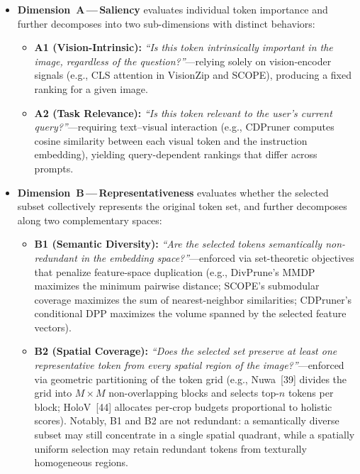 \documentclass[10pt,letterpaper]{article}
\newcommand{\eg}{e.g.}
\begin{document}
\begin{itemize}[leftmargin=*]
  \item \textbf{Dimension~A\,---\,Saliency} evaluates individual token
        importance and further decomposes into two sub-dimensions with
        distinct behaviors:
  \begin{itemize}
    \item \textbf{A1 (Vision-Intrinsic):}
          \textit{``Is this token intrinsically important in the image,
          regardless of the question?''}---relying solely on vision-encoder
          signals ({\eg}, CLS attention in VisionZip and SCOPE), producing
          a fixed ranking for a given image.
    \item \textbf{A2 (Task Relevance):}
          \textit{``Is this token relevant to the user's current
          query?''}---requiring text--visual interaction ({\eg}, CDPruner
          computes cosine similarity between each visual token and the
          instruction embedding), yielding query-dependent rankings that
          differ across prompts.
  \end{itemize}
  \item \textbf{Dimension~B\,---\,Representativeness} evaluates whether the
        selected subset collectively represents the original token set, and
        further decomposes along two complementary spaces:
  \begin{itemize}
    \item \textbf{B1 (Semantic Diversity):}
          \textit{``Are the selected tokens semantically non-redundant in the
          embedding space?''}---enforced via set-theoretic objectives that
          penalize feature-space duplication ({\eg}, DivPrune's MMDP maximizes
          the minimum pairwise distance; SCOPE's submodular coverage maximizes
          the sum of nearest-neighbor similarities; CDPruner's conditional DPP
          maximizes the volume spanned by the selected feature vectors).
    \item \textbf{B2 (Spatial Coverage):}
          \textit{``Does the selected set preserve at least one representative
          token from every spatial region of the image?''}---enforced via
          geometric partitioning of the token grid ({\eg}, Nuwa~[39] divides
          the grid into $M{\times}M$ non-overlapping blocks and selects top-$n$
          tokens per block; HoloV~[44] allocates per-crop budgets proportional
          to holistic scores).
          Notably, B1 and B2 are not redundant: a semantically diverse subset
          may still concentrate in a single spatial quadrant, while a spatially
          uniform selection may retain redundant tokens from texturally
          homogeneous regions.
  \end{itemize}
\end{itemize}
\end{document}
